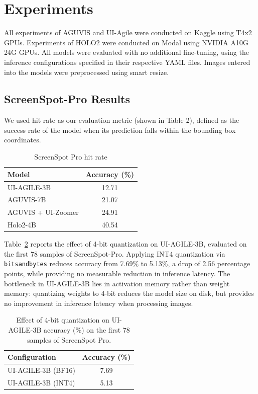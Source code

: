 \documentclass{article}
\theoremstyle{plain}
\theoremstyle{definition}
\theoremstyle{remark}
\begin{document}
\section{Experiments}
All experiments of AGUVIS and UI-Agile were conducted on Kaggle using T4x2 GPUs. Experiments of HOLO2 were conducted on Modal using NVIDIA A10G 24G GPUs. All models were evaluated with no additional fine-tuning, using the inference configurations specified in their respective YAML files. Images entered into the models were preprocessed using smart resize. 

\subsection{ScreenSpot-Pro Results}
We used hit rate as our evaluation metric (shown in Table 2), defined as the success rate of the model when its prediction falls within the bounding box coordinates.
\begin{table}[h]
    \centering
    \caption{ScreenSpot Pro hit rate}
    \label{tab:results}
    \begin{tabular}{lc}
    \toprule
    \textbf{Model} & \textbf{Accuracy (\%)} \\
    \midrule
    UI-AGILE-3B              & 12.71 \\
    AGUVIS-7B                & 21.07 \\
    AGUVIS + UI-Zoomer       & 24.91 \\
    Holo2-4B                 & 40.54 \\
    \bottomrule
    \end{tabular}
\end{table}


Table~\ref{tab:quantization} reports the effect of 4-bit quantization on
UI-AGILE-3B, evaluated on the first 78 samples of ScreenSpot-Pro. Applying INT4
quantization via \texttt{bitsandbytes} reduces accuracy from 7.69\% to 5.13\%,
a drop of 2.56 percentage points, while providing no measurable reduction in
inference latency. The bottleneck in UI-AGILE-3B lies in activation memory rather than weight memory: quantizing weights to 4-bit reduces the model size on disk, but provides no improvement in inference latency when processing images.

\begin{table}[H]
    \centering
    \caption{Effect of 4-bit quantization on UI-AGILE-3B accuracy (\%) on the first 78 samples of ScreenSpot Pro.}
    \label{tab:quantization}
    \begin{tabular}{lc}
    \toprule
    \textbf{Configuration} & \textbf{Accuracy (\%)} \\
    \midrule
    UI-AGILE-3B (BF16)       & 7.69 \\
    UI-AGILE-3B (INT4)        & 5.13 \\
    \bottomrule
    \end{tabular}
\end{table}
\end{document}
